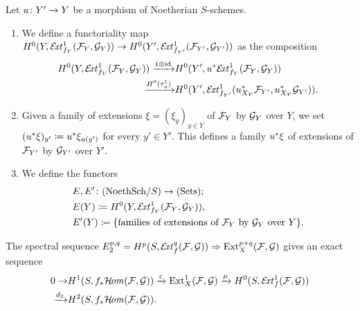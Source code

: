 \begin{definition} 
	Let $u\colon Y'\to Y$ be a morphism of Noetherian $S$-schemes.

	\begin{enumerate}\item We define a functoriality map
	$H^0(Y,\mathcal{E}\!\mathit{xt}^1_{f_Y}(\mathcal{F}_Y,\mathcal{G}_Y))
	\to
	H^0(Y',\mathcal{E}\!\mathit{xt}^1_{f_{Y'}}(\mathcal{F}_{Y'},\mathcal{G}_{Y'}))
	$
	as the composition
	\begin{align*}
		H^0(Y,\mathcal{E}\!\mathit{xt}^1_{f_Y}(\mathcal{F}_Y,\mathcal{G}_Y))
		\xrightarrow{1\otimes \operatorname{id}} & 
		H^0(Y',u^{*}\mathcal{E}\!\mathit{xt}^1_{f_Y}(\mathcal{F}_Y,\mathcal{G}_Y)) \\
		\xrightarrow{H^0(\tau^1_u)} &
		H^0(Y',\mathcal{E}\!\mathit{xt}^1_{f_{Y'}}(u_{X_Y}^{*}\mathcal{F}_{Y'},u_{X_Y}^{*}\mathcal{G}_{Y'})).
	\end{align*}

	\item Given a family of extensions $\xi = (\xi_y)_{y\in Y}$ of $\mathcal{F}_Y$ by $\mathcal{G}_Y$ over $Y$, we set $(u^{*}\xi)_{y'} \coloneqq u^{*}\xi_{u(y')}$ for every $y' \in Y'$. This defines a family $u^{*}\xi$ of extensions of $\mathcal{F}_{Y'}$ by $\mathcal{G}_{Y'}$ over $Y'$.

	\item We define the functors
	\begin{align*}
		& E,E' \colon (\textup{NoethSch}/S) \to (\textup{Sets}); \\
		& E(Y) \coloneqq H^0(Y,\mathcal{E}\!\mathit{xt}^1_{f_Y}(\mathcal{F}_Y,\mathcal{G}_Y)), \\
		& E'(Y) \coloneqq \{\text{families of extensions of $\mathcal{F}_Y$ by $\mathcal{G}_Y$ over } Y\}. \\
	\end{align*}
\end{enumerate}

\end{definition}

\begin{remark}
	The spectral sequence $E_2^{p,q}=H^p(S,\mathcal{E}\!\mathit{xt}^q_f(\mathcal{F},\mathcal{G})) \Rightarrow \operatorname{Ext}^{p+q}_X(\mathcal{F},\mathcal{G})$ gives an exact sequence
	\begin{align*}
		0
		 \to & H^1(S,f_{*}\mathcal{H}\!\mathit{om}(\mathcal{F},\mathcal{G}))
		 \xrightarrow{\varepsilon} \operatorname{Ext}^1_X(\mathcal{F},\mathcal{G})
		 \xrightarrow{\mu} H^0(S,\mathcal{E}\!\mathit{xt}^1_f(\mathcal{F},\mathcal{G})) \\
		 \xrightarrow{d_2} & H^2(S,f_{*}\mathcal{H}\!\mathit{om}(\mathcal{F},\mathcal{G})).
	\end{align*}
\end{remark}

